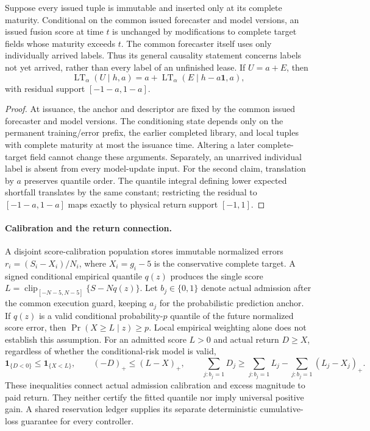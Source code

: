 \begin{proposition}
Suppose every issued tuple is immutable and inserted only at its complete
maturity. Conditional on the common issued forecaster and model versions,
an issued fusion score at time $t$ is unchanged by modifications to complete
target fields whose maturity exceeds $t$. The common forecaster itself uses
only individually arrived labels. Thus its general causality statement
concerns labels not yet arrived, rather than every label of an unfinished
lease. If $U=a+E$, then
\begin{equation}
 \operatorname{LT}_\alpha(U\mid h,a)
 =a+\operatorname{LT}_\alpha(E\mid h-a\mathbf1,a),
 \label{eq:prequential-tail-shift}
\end{equation}
with residual support $[-1-a,1-a]$.
\end{proposition}
\begin{proof}
At issuance, the anchor and descriptor are fixed by the common issued
forecaster and model versions. The conditioning state depends only on the
permanent training/error prefix, the earlier completed library, and local
tuples with complete maturity at most the issuance time. Altering a later
complete-target field cannot change these arguments. Separately, an
unarrived individual label is absent from every model-update input.
For the second claim,
translation by $a$ preserves quantile order. The quantile integral defining
lower expected shortfall translates by the same constant; restricting the
residual to $[-1-a,1-a]$ maps exactly to physical return support $[-1,1]$.
\end{proof}

\paragraph{Calibration and the return connection.}
A disjoint score-calibration population stores immutable normalized errors
$r_i=(S_i-X_i)/N_i$, where $X_i=g_i-5$ is the conservative complete target.
A signed conditional empirical quantile $q(z)$ produces the single score
$L=\operatorname{clip}_{[-N-5,N-5]}\{S-Nq(z)\}$.
Let $b_j\in\{0,1\}$ denote actual admission after the common execution
guard, keeping $a_j$ for the probabilistic prediction anchor.
If $q(z)$ is a valid conditional probability-$p$ quantile of the future
normalized score error, then
$\Pr(X\geq L\mid z)\geq p$. Local empirical weighting alone does not
establish this assumption. For an admitted score $L>0$ and actual return
$D\geq X$, regardless of whether the conditional-risk model is valid,
\begin{equation}
 \mathbf1_{\{D<0\}}\leq\mathbf1_{\{X<L\}},\qquad
 (-D)_+\leq(L-X)_+,\qquad
 \sum_{j:b_j=1}D_j\geq
 \sum_{j:b_j=1}L_j-\sum_{j:b_j=1}(L_j-X_j)_+.
 \label{eq:prequential-calibration-return}
\end{equation}
These inequalities connect actual admission calibration and excess magnitude
to paid return. They neither certify the fitted quantile nor imply universal
positive gain. A shared reservation ledger supplies its separate deterministic
cumulative-loss guarantee for every controller.

